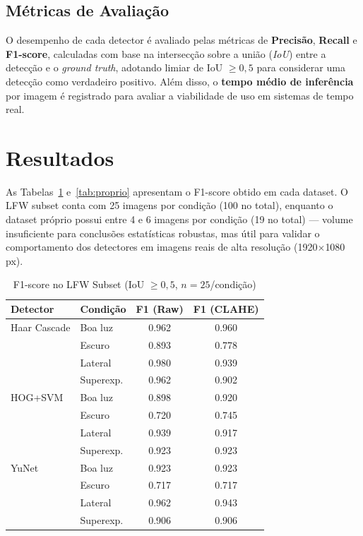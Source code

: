 \documentclass[conference]{IEEEtran}
\begin{document}
\subsection{M\'etricas de Avalia\c{c}\~ao}

O desempenho de cada detector \'e avaliado pelas m\'etricas de \textbf{Precis\~ao}, \textbf{Recall} e \textbf{F1-score}, calculadas com base na intersec\c{c}\~ao sobre a uni\~ao (\textit{IoU}) entre a detec\c{c}\~ao e o \textit{ground truth}, adotando limiar de IoU $\geq 0{,}5$ para considerar uma detec\c{c}\~ao como verdadeiro positivo. Al\'em disso, o \textbf{tempo m\'edio de infer\^encia} por imagem \'e registrado para avaliar a viabilidade de uso em sistemas de tempo real.

\section{Resultados}

As Tabelas~\ref{tab:lfw} e~\ref{tab:proprio} apresentam o F1-score obtido em cada dataset. O LFW subset conta com 25 imagens por condi\c{c}\~ao (100 no total), enquanto o dataset pr\'oprio possui entre 4 e 6 imagens por condi\c{c}\~ao (19 no total) --- volume insuficiente para conclus\~oes estat\'isticas robustas, mas \'util para validar o comportamento dos detectores em imagens reais de alta resolu\c{c}\~ao (1920$\times$1080\,px).

\begin{table}[!t]
\renewcommand{\arraystretch}{1.2}
\caption{F1-score no LFW Subset (IoU $\geq 0{,}5$, $n=25$/condi\c{c}\~ao)}
\label{tab:lfw}
\centering
\begin{tabular}{llcc}
\hline
\textbf{Detector} & \textbf{Condi\c{c}\~ao} & \textbf{F1 (Raw)} & \textbf{F1 (CLAHE)} \\
\hline
Haar Cascade & Boa luz       & 0.962 & 0.960 \\
             & Escuro        & 0.893 & 0.778 \\
             & Lateral       & 0.980 & 0.939 \\
             & Superexp.     & 0.962 & 0.902 \\
\hline
HOG+SVM      & Boa luz       & 0.898 & 0.920 \\
             & Escuro        & 0.720 & 0.745 \\
             & Lateral       & 0.939 & 0.917 \\
             & Superexp.     & 0.923 & 0.923 \\
\hline
YuNet        & Boa luz       & 0.923 & 0.923 \\
             & Escuro        & 0.717 & 0.717 \\
             & Lateral       & 0.962 & 0.943 \\
             & Superexp.     & 0.906 & 0.906 \\
\hline
\end{tabular}
\end{table}
\end{document}
